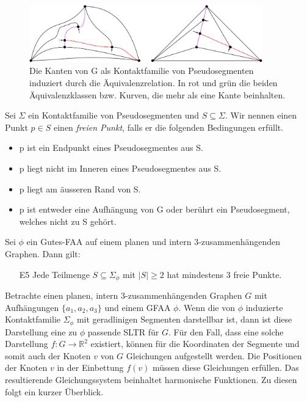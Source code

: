 \begin{figure}[h]
	\centering
  \includegraphics[width=0.9\textwidth]{pseudo_seg.png}
  \caption{Die Kanten von G als Kontaktfamilie von Pseudosegmenten induziert durch die Äquivalenzrelation. In rot und grün die beiden Äquivalenzklassen bzw. Kurven, die mehr als eine Kante beinhalten.}
\end{figure}

\begin{definition}
Sei $\Sigma$ ein Kontaktfamilie von Pseudosegmenten und $S\subseteq\Sigma$. Wir nennen einen Punkt $p\in S$ einen \textit{freien Punkt}, falls er die folgenden Bedingungen erfüllt.
\begin{itemize}
\item p ist ein Endpunkt eines Pseudosegmentes aus S.
\item p liegt nicht im Inneren eines Pseudosegmentes aus S.
\item p liegt am äusseren Rand von S.
\item p ist entweder eine Aufhängung von G oder berührt ein Pseudosegment, welches nicht zu S gehört.
\end{itemize} 
\end{definition}

\begin{lemma}\cite[Lemma 2.8]{af13}\label{lemma_af13}
Sei $\phi$ ein Gutes-FAA auf einem planen und intern 3-zusammenhängenden Graphen. Dann gilt: 
\begin{itemize}
\item [E5] Jede Teilmenge $S \subseteq \Sigma_{\phi}$ mit $|S| \geq 2$ hat mindestens 3 freie Punkte.
\end{itemize}
\end{lemma}

Betrachte einen planen, intern 3-zusammenhängenden Graphen $G$ mit Aufhängungen $\{a_1,a_2,a_3\}$ und einem GFAA $\phi$. Wenn die von $\phi$ induzierte Kontaktfamilie $\Sigma_{\phi}$ mit geradlinigen Segmenten darstellbar ist, dann ist diese Darstellung eine zu $\phi$ passende SLTR für $G$. Für den Fall, dass eine solche Darstellung $f:G\to\mathbb{R}^2$ existiert, können für die Koordinaten der Segmente und somit auch der Knoten $v$ von $G$ Gleichungen aufgestellt werden. Die Positionen der Knoten $v$ in der Einbettung $f(v)$ müssen diese Gleichungen erfüllen. Das resultierende Gleichungssystem beinhaltet harmonische Funktionen. Zu diesen folgt ein kurzer Überblick.

